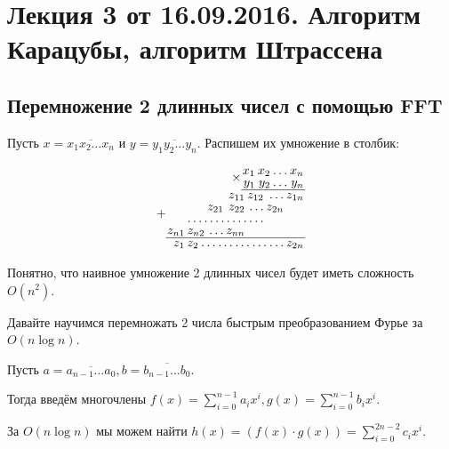 \documentclass[a4paper, 12pt]{article}
\begin{document}
\pagestyle{fancy}

\section{Лекция 3 от 16.09.2016. Алгоритм Карацубы, алгоритм Штрассена}

\subsection{Перемножение 2 длинных чисел с помощью FFT}

Пусть $x = \overline{x_1 x_2 \ldots x_n}$ и $y = \overline{y_1 y_2 \ldots y_n}$. Распишем их умножение в столбик:
\begin{center}
  \[
  \renewcommand{\arraystretch}{0.8}
  \arraycolsep=1pt
  \begin{array}{r}
  \times\begin{array}{rrrr}
  x_1 & x_2 & \ldots & x_n \\
  y_1 & y_2 & \ldots & y_n \\
  \hline
  \end{array}
  \\
  +\begin{array}{rrrrrrr}
  & & & z_{11} & z_{12} & \ldots & z_{1n} \\
  & & z_{21} & z_{22} & \ldots & z_{2n} & \\
  & \hdotsfor{4} & & \\
  z_{n1} & z_{n2} & \ldots & z_{nn} & & & \\
  \hline
  \end{array}
  \\
  \begin{array}{rrrrrrrr}
  z_{1} & z_{2} & \dots & \dots & \dots & \dots & \dots & z_{2n}\\
  \end{array}
  \end{array}\]
\end{center}

Понятно, что наивное умножение 2 длинных чисел будет иметь сложность $O(n^2)$.

Давайте научимся перемножать 2 числа быстрым преобразованием Фурье за $O(n\log n)$.

Пусть $a = \overline{a_{n - 1}\ldots a_0}, b = \overline{b_{n - 1}\ldots b_0}$.

Тогда введём многочлены $f(x) = \sum\limits_{i = 0}^{n - 1} a_ix^i,
g(x) = \sum\limits_{i = 0}^{n - 1} b_ix^i$.

За $O(n\log n)$ мы можем найти $h(x) = (f(x) \cdot g(x)) = \sum\limits_{i = 0}^{2n - 2} c_i x^i$.
\end{document}
